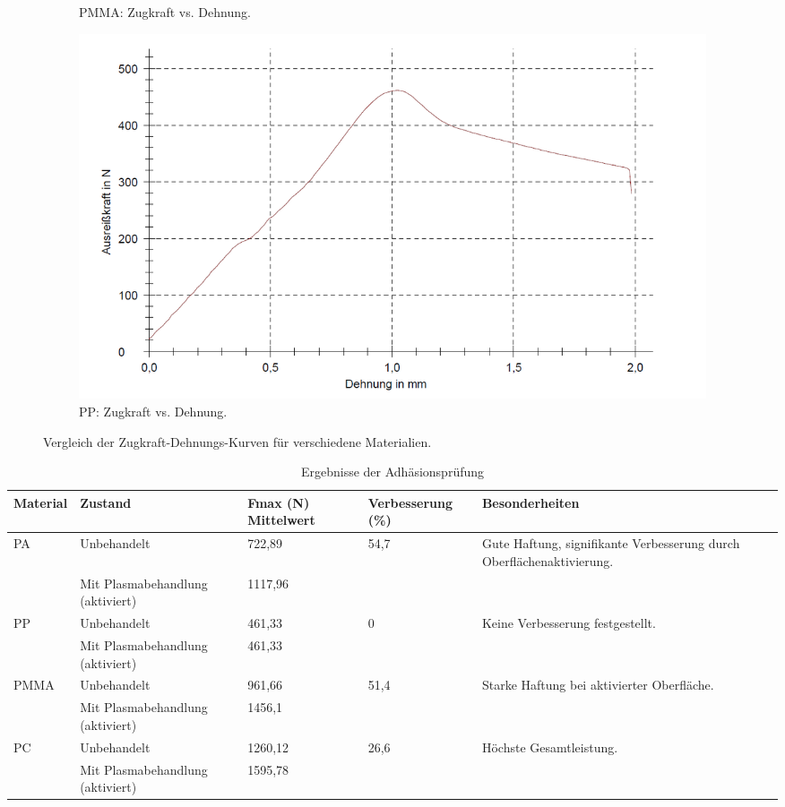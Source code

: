 \documentclass[a4paper,12pt]{article}
\begin{document}
\begin{figure}[H]
\begin{subfigure}{0.45\textwidth}
    \caption{PMMA: Zugkraft vs. Dehnung.}
\end{subfigure}
\hfill
\begin{subfigure}{0.45\textwidth}
    \includegraphics[width=\textwidth]{images/PP.png}
    \caption{PP: Zugkraft vs. Dehnung.}
\end{subfigure}
\caption{Vergleich der Zugkraft-Dehnungs-Kurven für verschiedene Materialien.}
\label{fig:load-strain}
\end{figure}

\renewcommand{\arraystretch}{1.1}
\setlength{\tabcolsep}{5pt}
\begin{table}[H]
\centering
\caption{Ergebnisse der Adh\"asionspr\"ufung}
\begin{tabular}{|p{2.5cm}|p{2.5cm}|p{3cm}|p{2.5cm}|p{4cm}|}
\hline
Material & Zustand & Fmax (N) Mittelwert & Verbesserung (\%) & Besonderheiten \\
\hline
PA & Unbehandelt & 722,89 & 54,7 & Gute Haftung, signifikante Verbesserung durch Oberflächenaktivierung. \\
   & Mit Plasmabehandlung (aktiviert)    & 1117,96 &       & \\
\hline
PP & Unbehandelt & 461,33 & 0     & Keine Verbesserung festgestellt. \\
   & Mit Plasmabehandlung (aktiviert)    & 461,33 &       & \\
\hline
PMMA & Unbehandelt & 961,66 & 51,4 & Starke Haftung bei aktivierter Oberfläche. \\
     & Mit Plasmabehandlung (aktiviert)    & 1456,1 &       & \\
\hline
PC & Unbehandelt & 1260,12 & 26,6 & Höchste Gesamtleistung. \\
   & Mit Plasmabehandlung (aktiviert)    & 1595,78 &       & \\
\hline
\end{tabular}
\label{tab:adhesion-results}
\end{table}
\end{document}
